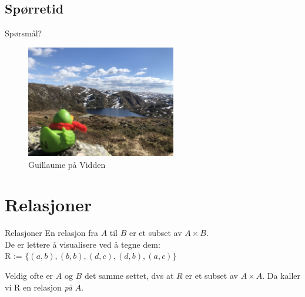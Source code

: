\subsection*{Spørretid}
\begin{frame}{Spørsmål?}
    \begin{figure}
        \centering
        \includegraphics[height = 4.9cm]{images/guillaume4.jpg}
        \caption{Guillaume på Vidden}
        \label{fig:guillaume4}
    \end{figure}
\end{frame}

\section{Relasjoner}
\begin{frame}[fragile]{Relasjoner}
    En relasjon fra $A$ til $B$ er et subset av $A \times B$.\\
    \pause
    De er lettere å visualisere ved å tegne dem:\\
    
    R := $\{(a, b), (b, b), (d, c), (d, b), (a, c)\}$\\

\pause
Veldig ofte er $A$ og $B$ det samme settet, dvs at $R$ er et subset av $A \times A$. Da kaller vi R en relasjon \emph{på} $A$.
\end{frame}

